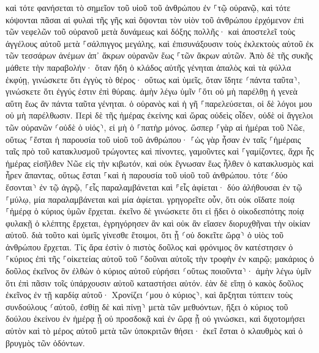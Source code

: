 \documentclass[twoside, 9pt]{extreport}
\begin{document}
καὶ τότε φανήσεται τὸ σημεῖον τοῦ υἱοῦ τοῦ ἀνθρώπου ἐν ⸀τῷ οὐρανῷ, καὶ τότε κόψονται πᾶσαι αἱ φυλαὶ τῆς γῆς καὶ ὄψονται τὸν υἱὸν τοῦ ἀνθρώπου ἐρχόμενον ἐπὶ τῶν νεφελῶν τοῦ οὐρανοῦ μετὰ δυνάμεως καὶ δόξης πολλῆς· 
καὶ ἀποστελεῖ τοὺς ἀγγέλους αὐτοῦ μετὰ ⸀σάλπιγγος μεγάλης, καὶ ἐπισυνάξουσιν τοὺς ἐκλεκτοὺς αὐτοῦ ἐκ τῶν τεσσάρων ἀνέμων ἀπ᾽ ἄκρων οὐρανῶν ἕως ⸀τῶν ἄκρων αὐτῶν. 
Ἀπὸ δὲ τῆς συκῆς μάθετε τὴν παραβολήν· ὅταν ἤδη ὁ κλάδος αὐτῆς γένηται ἁπαλὸς καὶ τὰ φύλλα ἐκφύῃ, γινώσκετε ὅτι ἐγγὺς τὸ θέρος· 
οὕτως καὶ ὑμεῖς, ὅταν ἴδητε ⸂πάντα ταῦτα⸃, γινώσκετε ὅτι ἐγγύς ἐστιν ἐπὶ θύραις. 
ἀμὴν λέγω ὑμῖν ⸀ὅτι οὐ μὴ παρέλθῃ ἡ γενεὰ αὕτη ἕως ἂν πάντα ταῦτα γένηται. 
ὁ οὐρανὸς καὶ ἡ γῆ ⸀παρελεύσεται, οἱ δὲ λόγοι μου οὐ μὴ παρέλθωσιν. 
Περὶ δὲ τῆς ἡμέρας ἐκείνης καὶ ὥρας οὐδεὶς οἶδεν, οὐδὲ οἱ ἄγγελοι τῶν οὐρανῶν ⸂οὐδὲ ὁ υἱός⸃, εἰ μὴ ὁ ⸀πατὴρ μόνος. 
ὥσπερ ⸀γὰρ αἱ ἡμέραι τοῦ Νῶε, οὕτως ⸀ἔσται ἡ παρουσία τοῦ υἱοῦ τοῦ ἀνθρώπου· 
⸀ὡς γὰρ ἦσαν ἐν ταῖς ⸀ἡμέραις ταῖς πρὸ τοῦ κατακλυσμοῦ τρώγοντες καὶ πίνοντες, γαμοῦντες καὶ ⸀γαμίζοντες, ἄχρι ἧς ἡμέρας εἰσῆλθεν Νῶε εἰς τὴν κιβωτόν, 
καὶ οὐκ ἔγνωσαν ἕως ἦλθεν ὁ κατακλυσμὸς καὶ ἦρεν ἅπαντας, οὕτως ἔσται ⸀καὶ ἡ παρουσία τοῦ υἱοῦ τοῦ ἀνθρώπου. 
τότε ⸂δύο ἔσονται⸃ ἐν τῷ ἀγρῷ, ⸀εἷς παραλαμβάνεται καὶ ⸁εἷς ἀφίεται· 
δύο ἀλήθουσαι ἐν τῷ ⸀μύλῳ, μία παραλαμβάνεται καὶ μία ἀφίεται. 
γρηγορεῖτε οὖν, ὅτι οὐκ οἴδατε ποίᾳ ⸀ἡμέρᾳ ὁ κύριος ὑμῶν ἔρχεται. 
ἐκεῖνο δὲ γινώσκετε ὅτι εἰ ᾔδει ὁ οἰκοδεσπότης ποίᾳ φυλακῇ ὁ κλέπτης ἔρχεται, ἐγρηγόρησεν ἂν καὶ οὐκ ἂν εἴασεν διορυχθῆναι τὴν οἰκίαν αὐτοῦ. 
διὰ τοῦτο καὶ ὑμεῖς γίνεσθε ἕτοιμοι, ὅτι ᾗ ⸂οὐ δοκεῖτε ὥρᾳ⸃ ὁ υἱὸς τοῦ ἀνθρώπου ἔρχεται. 
Τίς ἄρα ἐστὶν ὁ πιστὸς δοῦλος καὶ φρόνιμος ὃν κατέστησεν ὁ ⸀κύριος ἐπὶ τῆς ⸀οἰκετείας αὐτοῦ τοῦ ⸀δοῦναι αὐτοῖς τὴν τροφὴν ἐν καιρῷ; 
μακάριος ὁ δοῦλος ἐκεῖνος ὃν ἐλθὼν ὁ κύριος αὐτοῦ εὑρήσει ⸂οὕτως ποιοῦντα⸃· 
ἀμὴν λέγω ὑμῖν ὅτι ἐπὶ πᾶσιν τοῖς ὑπάρχουσιν αὐτοῦ καταστήσει αὐτόν. 
ἐὰν δὲ εἴπῃ ὁ κακὸς δοῦλος ἐκεῖνος ἐν τῇ καρδίᾳ αὐτοῦ· Χρονίζει ⸂μου ὁ κύριος⸃, 
καὶ ἄρξηται τύπτειν τοὺς συνδούλους ⸂αὐτοῦ, ἐσθίῃ δὲ καὶ πίνῃ⸃ μετὰ τῶν μεθυόντων, 
ἥξει ὁ κύριος τοῦ δούλου ἐκείνου ἐν ἡμέρᾳ ᾗ οὐ προσδοκᾷ καὶ ἐν ὥρᾳ ᾗ οὐ γινώσκει, 
καὶ διχοτομήσει αὐτὸν καὶ τὸ μέρος αὐτοῦ μετὰ τῶν ὑποκριτῶν θήσει· ἐκεῖ ἔσται ὁ κλαυθμὸς καὶ ὁ βρυγμὸς τῶν ὀδόντων. 
\end{document}
